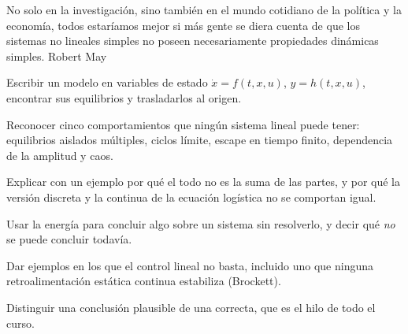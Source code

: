
  {No solo en la investigación, sino también en el mundo cotidiano de la política y la economía, todos estaríamos mejor si más gente se diera cuenta de que los sistemas no lineales simples no poseen necesariamente propiedades dinámicas simples.}
  {Robert May}

\begin{objetivos}
  \item Escribir un modelo en variables de estado $\dot x=f(t,x,u)$, $y=h(t,x,u)$, encontrar sus equilibrios y trasladarlos al origen.
  \item Reconocer cinco comportamientos que ningún sistema lineal puede tener: equilibrios aislados múltiples, ciclos límite, escape en tiempo finito, dependencia de la amplitud y caos.
  \item Explicar con un ejemplo por qué el todo no es la suma de las partes, y por qué la versión discreta y la continua de la ecuación logística no se comportan igual.
  \item Usar la energía para concluir algo sobre un sistema sin resolverlo, y decir qué \emph{no} se puede concluir todavía.
  \item Dar ejemplos en los que el control lineal no basta, incluido uno que ninguna retroalimentación estática continua estabiliza (Brockett).
  \item Distinguir una conclusión plausible de una correcta, que es el hilo de todo el curso.
\end{objetivos}











